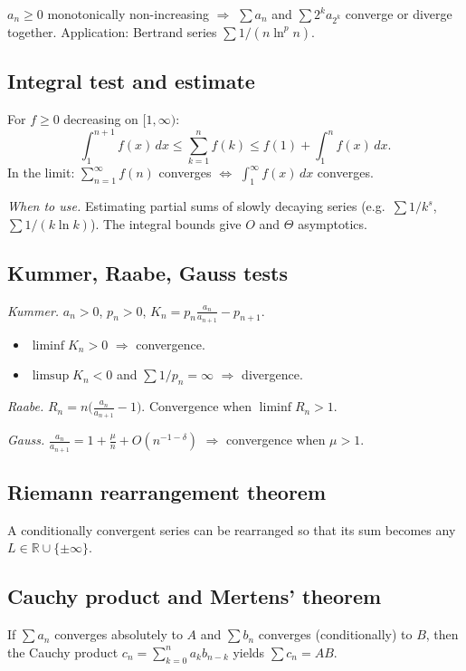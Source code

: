 $a_n\geq0$ monotonically non-increasing $\Rightarrow$ $\sum a_n$ and $\sum 2^k a_{2^k}$ converge or diverge together. Application: Bertrand series $\sum 1/(n\ln^p n)$.

\medskip

\subsection{Integral test and estimate}
\label{subsec:integral-test}

For $f\ge0$ decreasing on $[1,\infty)$:
$$\int_1^{n+1} f(x)\,dx \le \sum_{k=1}^n f(k) \le f(1)+\int_1^n f(x)\,dx.$$
In the limit: $\sum_{n=1}^\infty f(n)$ converges $\iff$ $\int_1^\infty f(x)\,dx$ converges.

\textit{When to use.} Estimating partial sums of slowly decaying series (e.g.\ $\sum 1/k^s$, $\sum 1/(k\ln k)$). The integral bounds give $O$ and $\Theta$ asymptotics.

\medskip

\subsection{Kummer, Raabe, Gauss tests}
\label{subsec:kummer-raabe-gauss}

\textit{Kummer.} $a_n>0$, $p_n>0$, $K_n=p_n\frac{a_n}{a_{n+1}}-p_{n+1}$.
\begin{itemize}
  \item $\liminf K_n>0$ $\Rightarrow$ convergence.
  \item $\limsup K_n<0$ and $\sum 1/p_n=\infty$ $\Rightarrow$ divergence.
\end{itemize}

\textit{Raabe.} $R_n=n\bigl(\frac{a_n}{a_{n+1}}-1\bigr)$. Convergence when $\liminf R_n>1$.

\textit{Gauss.} $\frac{a_n}{a_{n+1}}=1+\frac{\mu}{n}+O(n^{-1-\delta})$ $\Rightarrow$ convergence when $\mu>1$.

\medskip

\subsection{Riemann rearrangement theorem}
\label{subsec:riemann-rearrangement}

A conditionally convergent series can be rearranged so that its sum becomes any $L\in\mathbb{R}\cup\{\pm\infty\}$.

\medskip

\subsection{Cauchy product and Mertens' theorem}
\label{subsec:mertens}

If $\sum a_n$ converges absolutely to $A$ and $\sum b_n$ converges (conditionally) to $B$, then the Cauchy product $c_n=\sum_{k=0}^n a_k b_{n-k}$ yields $\sum c_n=AB$.

